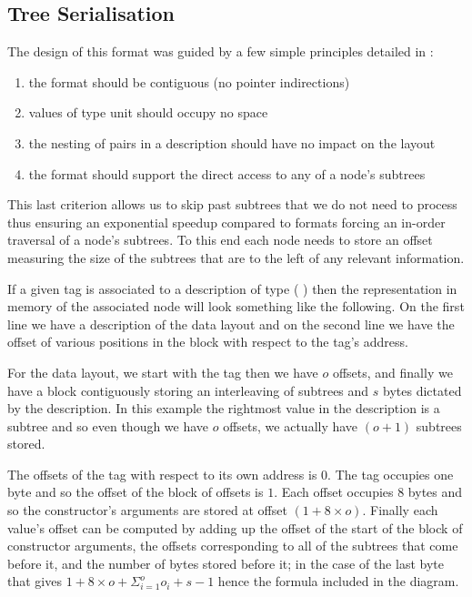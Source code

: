 \subsection{Tree Serialisation}\label{sec:tree-serialisation}

The design of this format was guided by a few simple principles
detailed in :
\begin{enumerate}
  \item the format should be contiguous (no pointer indirections)
  \item values of type unit should occupy no space
  \item the nesting of pairs in a description should have no impact on the layout
  \item the format should support the direct access to any of a node's subtrees
\end{enumerate}
%
This last criterion allows us to skip past subtrees
that we do not need to process thus ensuring an exponential
speedup compared to formats forcing an in-order traversal of
a node's subtrees.
%
To this end each node needs to store an offset measuring the size of the
subtrees that are to the left of any relevant information.

If a given tag is associated to a description of type
(   )
then the representation in memory of the associated node will look something
like the following.
%
On the first line we have a description of the data layout and on the
second line we have the offset of various positions in the block with
respect to the tag's address.

\label{fig:data-layout}
\begin{center}

\end{center}


For the data layout,
we start with the tag
then we have $o$ offsets,
and finally we have a block contiguously storing an interleaving of
subtrees and $s$ bytes
dictated by the description.
%
In this example the rightmost value in the description is a subtree and
so even though we have $o$ offsets, we actually have $(o+1)$ subtrees stored.

The offsets of the tag with respect to its own address is $0$.
The tag occupies one byte and so the offset of the block of offsets is $1$.
Each offset occupies 8 bytes and so the constructor's arguments
are stored at offset $(1+8\times{}o)$.
Finally each value's offset can be computed by adding up
the offset of the start of the block of constructor arguments,
the offsets corresponding to all of the subtrees that come before it,
and the number of bytes stored before it;
in the case of the last byte that gives $1+8\times{}o + \Sigma_{i=1}^{o}o_i + s-1$
hence the formula included in the diagram.

